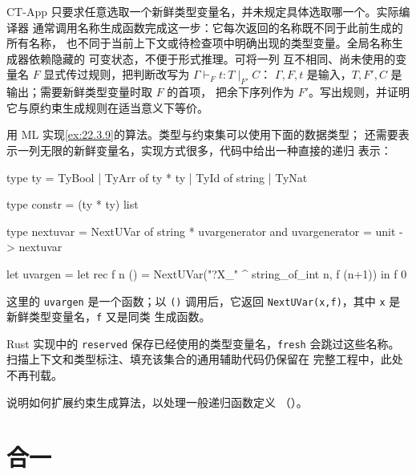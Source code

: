 \begin{exercise}
\label{ex:22.3.9}
CT-App 只要求任意选取一个新鲜类型变量名，并未规定具体选取哪一个。实际编译器
通常调用名称生成函数完成这一步：它每次返回的名称既不同于此前生成的所有名称，
也不同于当前上下文或待检查项中明确出现的类型变量。全局名称生成器依赖隐藏的
可变状态，不便于形式推理。可将一列
互不相同、尚未使用的变量名 \(F\) 显式传过规则，把判断改写为
\(\Gamma\vdash_F t:T\mid_{F'}C\)：
\(\Gamma,F,t\) 是输入，\(T,F',C\) 是输出；需要新鲜类型变量时取 \(F\) 的首项，
把余下序列作为 \(F'\)。写出规则，并证明它与原约束生成规则在适当意义下等价。
\end{exercise}

\begin{exercise}
\label{ex:22.3.10}
用 ML 实现\cref{ex:22.3.9}的算法。类型与约束集可以使用下面的数据类型；
还需要表示一列无限的新鲜变量名，实现方式很多，代码中给出一种直接的递归
表示：
\begin{taplocamlcode}
type ty =
    TyBool
  | TyArr of ty * ty
  | TyId of string
  | TyNat

type constr = (ty * ty) list

type nextuvar = NextUVar of string * uvargenerator
and uvargenerator = unit -> nextuvar

let uvargen =
  let rec f n () = NextUVar("?X_" ^ string_of_int n, f (n+1))
  in f 0
\end{taplocamlcode}
这里的 \texttt{uvargen} 是一个函数；以 \texttt{()} 调用后，它返回
\texttt{NextUVar(x,f)}，其中 \texttt{x} 是新鲜类型变量名，\texttt{f} 又是同类
生成函数。

Rust 实现中的 \texttt{reserved} 保存已经使用的类型变量名，\texttt{fresh}
会跳过这些名称。扫描上下文和类型标注、填充该集合的通用辅助代码仍保留在
完整工程中，此处不再刊载。
\end{exercise}

\begin{exercise}[\(\star\)]
\label{ex:22.3.11}
说明如何扩展约束生成算法，以处理一般递归函数定义
（）。
\end{exercise}

\section{合一}
\label{sec:22.4}

